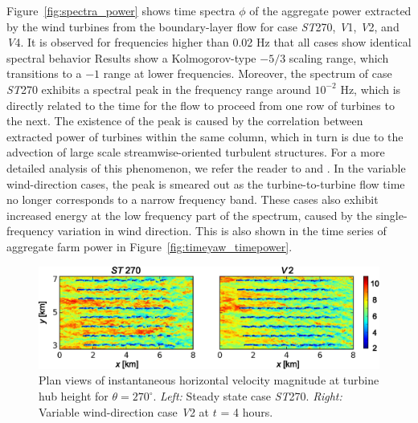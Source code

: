 		Figure~\ref{fig:spectra_power} shows time spectra $\phi$ of the aggregate power extracted by the wind turbines from the boundary-layer flow for case \emph{ST}270, \emph{V}1, \emph{V}2, and \emph{V}4. It is observed for frequencies higher than 0.02 Hz that all cases show identical spectral behavior Results show a Kolmogorov-type $-5/3$ scaling range, which transitions to a $-1$ range at lower frequencies. Moreover, the spectrum  of case \emph{ST}270 exhibits a spectral peak in the frequency range around $10^{-2}$ Hz, which is directly related to the time for the flow to proceed from one row of turbines to the next. The existence of the peak is caused by the correlation between extracted power of turbines within the same column, which in turn is due to the advection of large scale streamwise-oriented turbulent structures. For a more detailed analysis of this phenomenon, we refer the reader to \cite{stevens2014temporal} and \cite{bossuyt2017wind}. In the variable wind-direction cases, the peak is smeared out as the turbine-to-turbine flow time no longer corresponds to a narrow frequency band. These cases also exhibit increased energy at the low frequency part of the spectrum, caused by the single-frequency variation in wind direction. This is also shown in the time series of aggregate farm power in Figure~\ref{fig:timeyaw_timepower}.
		
		\begin{figure}[ht]
			\centering
			\includegraphics[width=\textwidth]{chapters/turbulent_inflow/blm/fig13_3}
			\caption[Plan views of instantaneous horizontal velocity magnitude at turbine hub height for $\theta = 270^\circ$]{Plan views of instantaneous horizontal velocity magnitude at turbine hub height for $\theta = 270^\circ$. \emph{Left: } Steady state case \emph{ST}270. \emph{Right: } Variable wind-direction case \emph{V}2 at $t$ = 4 hours.}
			\label{fig:explanation_undershoot}
		\end{figure}
		
